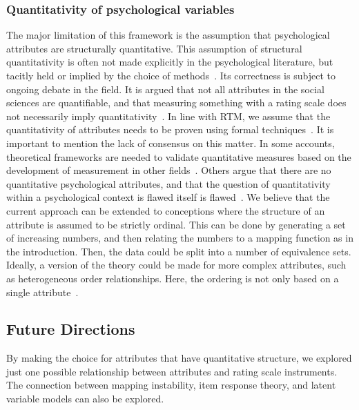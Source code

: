 \documentclass[titlepage, a4paper, 11pt]{article}
\begin{document}
\subsubsection{Quantitativity of psychological variables}
The major limitation of this framework is the assumption that psychological attributes are structurally quantitative. This assumption of structural quantitativity is often not made explicitly in the psychological literature, but tacitly held or implied by the choice of methods~\citep{michell_substandard_2017}. Its correctness is subject to ongoing debate in the field. It is argued that not all attributes in the social sciences are quantifiable, and that measuring something with a rating scale does not necessarily imply quantitativity~\citep{georgescu-roegen_measure_1965, uher_quantitative_2018}. In line with RTM, we assume that the quantitativity of attributes needs to be proven using formal techniques~\citep{luce_simultaneous_1964}. It is important to mention the lack of consensus on this matter. In some accounts, theoretical frameworks are needed to validate quantitative measures based on the development of measurement in other fields~\citep{bringmann_heating_2016, hasselman_going_2023, chang_inventing_2004}. Others argue that there are no quantitative psychological attributes, and that the question of quantitativity within a psychological context is flawed itself is flawed~\citep{tafreshi_quantification_2016,franz_are_2022}. We believe that the current approach can be extended to conceptions where the structure of an attribute is assumed to be strictly ordinal. This can be done by generating a set of increasing numbers, and then relating the numbers to a mapping function as in the introduction. Then, the data could be split into a number of equivalence sets. Ideally, a version of the theory could be made for more complex attributes, such as heterogeneous order relationships. Here, the ordering is not only based on a single attribute~\citep{michell_alfred_2012}.

\subsection{Future Directions}
By making the choice for attributes that have quantitative structure, we explored just one possible relationship between attributes and rating scale instruments. The connection between mapping instability, item response theory, and latent variable models can also be explored.
\end{document}
